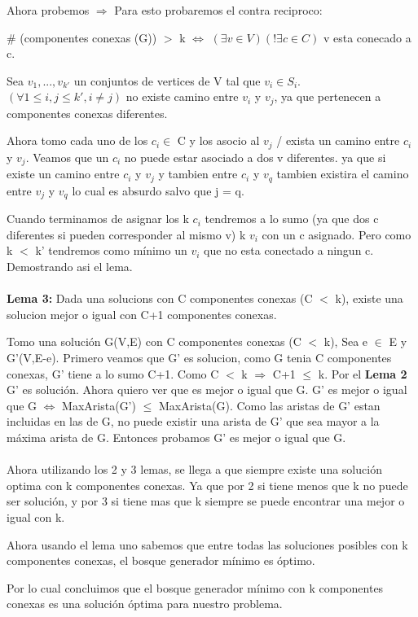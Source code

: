 Ahora probemos $\Rightarrow$
Para esto probaremos el contra reciproco:

$\#$ (componentes conexas (G)) $>$ k  $\Leftrightarrow$ $(\exists v \in V)(! \exists c \in C)$ v esta conecado a c. 

Sea ${v_1,...,v_{k'}}$ un conjuntos de vertices de V tal que $v_i \in S_i$. $(\forall 1 \leq i,j \leq k', i \neq j)$ no existe camino entre $v_i$ y $v_j$, ya que pertenecen a componentes conexas diferentes.

Ahora tomo cada uno de los $c_i \in$ C y los asocio al $v_j$ / exista un camino entre $c_i$ y $v_j$. Veamos que un $c_i$ no puede estar asociado a dos v diferentes. ya que si existe un camino entre $c_i$ y $v_j$ y tambien entre $c_i$ y $v_q$ tambien existira el camino entre $v_j$ y $v_q$ lo cual es absurdo salvo que j = q.

Cuando terminamos de asignar los k $c_i$ tendremos a lo sumo (ya que dos c diferentes si pueden corresponder al mismo v) k $v_i$ con un c asignado. Pero como k $<$ k' tendremos como mínimo un $v_i$ que no esta conectado a ningun c. Demostrando asi el lema. \\ \\


\textbf{Lema 3:} Dada una solucions con C componentes conexas (C $<$ k), existe una solucion mejor o igual con C+1 componentes conexas.

Tomo una solución G(V,E) con C componentes conexas (C $<$ k), Sea e $\in$ E y G'(V,E-e).
Primero veamos que G' es solucion, como G tenia C componentes conexas, G' tiene a lo sumo C+1. Como C $<$ k $\Rightarrow$ C+1 $\leq$ k. Por el \textbf{Lema 2} G' es solución. 
Ahora quiero ver que es mejor o igual que G.
G' es mejor o igual que G $\Leftrightarrow$ MaxArista(G') $\leq$ MaxArista(G).
Como las aristas de G' estan incluidas en las de G, no puede existir una arista de G' que sea mayor a la máxima arista de G.
Entonces probamos G' es mejor o igual que G. \\ \\

Ahora utilizando los 2 y 3 lemas, se llega a que siempre existe una solución optima con k componentes conexas.
Ya que por 2 si tiene menos que k no puede ser solución, y por 3 si tiene mas que k siempre se puede encontrar una mejor o igual con k.

Ahora usando el lema uno sabemos que entre todas las soluciones posibles con k componentes conexas, el bosque generador mínimo es óptimo.

Por lo cual concluimos que el bosque generador mínimo con k componentes conexas es una solución óptima para nuestro problema.


